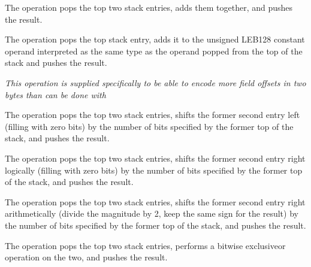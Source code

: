 \begin{enumerate}[1. ]
\itembfnl{\DWOPplusTARG}
The \DWOPplusNAME{} operation pops the top two stack entries,
adds them together, and pushes the result.

\itembfnl{\DWOPplusuconstTARG}
The \DWOPplusuconstNAME{} operation pops the top stack entry,
adds it to the unsigned LEB128
constant operand 
\bb
interpreted as the same type as the operand popped from the 
top of the stack
\eb
and pushes the result.

\textit{This operation is supplied specifically to be
able to encode more field offsets in two bytes than can be
done with
}

\itembfnl{\DWOPshlTARG}
The \DWOPshlNAME{} operation pops the top two stack entries,
shifts the former second entry left (filling with zero bits)
by the number of bits specified by the former top of the stack,
and pushes the result.

\itembfnl{\DWOPshrTARG}
The \DWOPshrNAME{} operation pops the top two stack entries,
shifts the former second entry right logically (filling with
zero bits) by the number of bits specified by the former top
of the stack, and pushes the result.

\itembfnl{\DWOPshraTARG}
The \DWOPshraNAME{} operation pops the top two stack entries,
shifts the former second entry right arithmetically (divide
the magnitude by 2, keep the same sign for the result) by
the number of bits specified by the former top of the stack,
and pushes the result.

\itembfnl{\DWOPxorTARG}
The \DWOPxorNAME{} operation pops the top two stack entries,
performs a bitwise exclusive\dash or operation on the two, and
pushes the result.

\end{enumerate}

